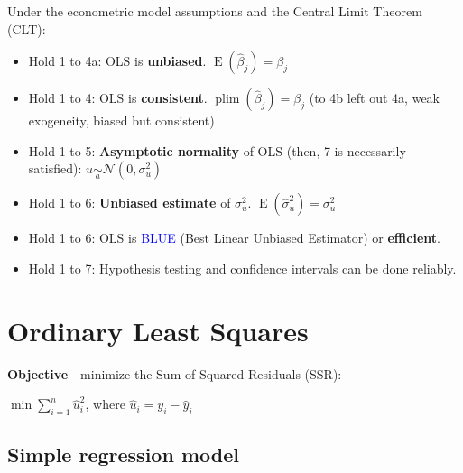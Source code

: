 \documentclass[10pt, a4paper, landscape]{article}
\DeclareMathOperator{\E}{E}
\begin{document}
\begin{multicols}{3}
Under the econometric model assumptions and the Central Limit Theorem (CLT):

\begin{itemize}[leftmargin=*]
	\item Hold 1 to 4a: OLS is \textbf{unbiased}. \( \E(\hat{\beta}_{j}) = \beta_{j} \)
	\item Hold 1 to 4: OLS is \textbf{consistent}. \( \operatorname{plim}(\hat{\beta}_{j}) = \beta_{j} \) (to 4b left out 4a, weak exogeneity, biased but consistent)
	\item Hold 1 to 5: \textbf{Asymptotic normality} of OLS (then, 7 is necessarily satisfied): \( u \underset{a}{\sim} \mathcal{N} (0, \sigma_{u}^{2}) \)
	\item Hold 1 to 6: \textbf{Unbiased estimate} of \( \sigma_{u}^{2} \). \( \E(\hat{\sigma}_{u}^{2}) = \sigma_{u}^{2} \)
	\item Hold 1 to 6: OLS is \textcolor{blue}{BLUE} (Best Linear Unbiased Estimator) or \textbf{efficient}.
	\item Hold 1 to 7: Hypothesis testing and confidence intervals can be done reliably.
\end{itemize}

\columnbreak

\section*{Ordinary Least Squares}

\textbf{Objective} - minimize the Sum of Squared Residuals (SSR):

\begin{center}
	\( \min \sum_{i = 1}^{n} \hat{u}_{i}^{2} \), where \( \hat{u}_{i} = y_{i} - \hat{y}_{i} \)
\end{center}

\subsection*{Simple regression model}

\setlength{\multicolsep}{2pt}
\setlength{\columnsep}{-40pt}
\begin{multicols}{2}



\end{multicols}
\end{multicols}
\end{document}
